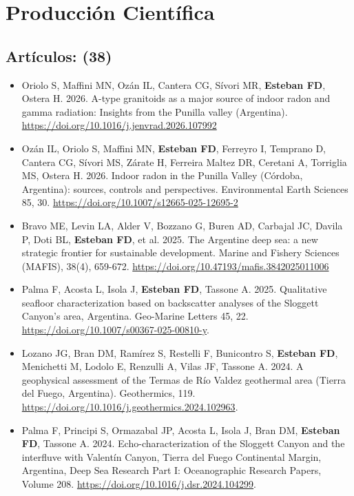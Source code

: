 \documentclass[11pt, a4paper]{article}
\begin{document}
\section{Producción Científica}


\subsection{Artículos: (38)}

\begin{itemize}
    \item Oriolo S, Maffini MN, Ozán IL, Cantera CG, Sívori MR, \textbf{Esteban FD}, Ostera H. 2026. A-type granitoids as a major source of indoor radon and gamma radiation: Insights from the Punilla valley (Argentina). \url{https://doi.org/10.1016/j.jenvrad.2026.107992}
    \item Ozán IL, Oriolo S, Maffini MN, \textbf{Esteban FD}, Ferreyro I, Temprano D, Cantera CG, Sívori MS, Zárate H, Ferreira Maltez DR, Ceretani A, Torriglia MS, Ostera H. 2026. Indoor radon in the Punilla Valley (Córdoba, Argentina): sources, controls and perspectives. Environmental Earth Sciences 85, 30. \url{https://doi.org/10.1007/s12665-025-12695-2}
    \item Bravo ME, Levin LA, Alder V, Bozzano G, Buren AD, Carbajal JC, Davila P, Doti BL, \textbf{Esteban FD}, et al. 2025. The Argentine deep sea: a new strategic frontier for sustainable development. Marine and Fishery Sciences (MAFIS), 38(4), 659-672. \url{https://doi.org/10.47193/mafis.3842025011006}
    \item Palma F, Acosta L, Isola J, \textbf{Esteban FD}, Tassone A. 2025. Qualitative seafloor characterization based on backscatter analyses of the Sloggett Canyon’s area, Argentina. Geo-Marine Letters 45, 22. \url{https://doi.org/10.1007/s00367-025-00810-y}.
    \item Lozano JG, Bran DM, Ramírez S, Restelli F, Bunicontro S, \textbf{Esteban FD}, Menichetti M, Lodolo E, Renzulli A, Vilas JF, Tassone A. 2024. A geophysical assessment of the Termas de Río Valdez geothermal area (Tierra del Fuego, Argentina). Geothermics, 119. \url{https://doi.org/10.1016/j.geothermics.2024.102963}.
    \item Palma F, Principi S, Ormazabal JP, Acosta L, Isola J, Bran DM, \textbf{Esteban FD}, Tassone A. 2024. Echo-characterization of the Sloggett Canyon and the interfluve with Valentín Canyon, Tierra del Fuego Continental Margin, Argentina, Deep Sea Research Part I: Oceanographic Research Papers, Volume 208. \url{https://doi.org/10.1016/j.dsr.2024.104299}.

\end{itemize}
\end{document}
